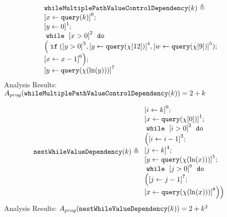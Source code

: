             \begin{example}
                \[
                    \begin{array}{l}
                    \kw{whileMultiplePathValueControlDependency}(k) \triangleq\\
                        \clabel{ \assign{x}{\query(k)}}^{0} ; \\
                        \clabel{\assign{y}{0} }^{1} ; \\
                            \ewhile ~ \clabel{x > 0}^{2} ~ \edo ~ \\
                            \Big(
                             \eif(\clabel{y > 0}^{3}, 
                             \clabel{\assign{y}{\query(\chi[12])}}^{4}, 
                             \clabel{\assign{w}{\query(\chi[9])}}^{5});                            
                             \\
                             \clabel{\assign{x}{x-1}}^{6}\Big);\\
                             \clabel{\assign{y}{\query(\chi(\ln(y)))} }^{7} 
                        \end{array}
                    \]
                    Analysis Results: $ A_{{prog}}(\mathtt{whileMultiplePathValueControlDependency}(k)) = 2 + k $
                \end{example}
                \begin{example}
                    \[
                    \kw{nestWhileValueDependency}(k) \triangleq 
                    \begin{array}{l}
                        \clabel{ \assign{i}{k} }^{0} ; \\
                        \clabel{\assign{x}{\query(\chi[0])}}^{1} ; \\
                            \ewhile ~ \clabel{i > 0}^{2} ~ \edo ~ \\
                            \Big(
                             \clabel{\assign{i}{i-1}}^{3} ;\\
                             \clabel{\assign{j}{k}}^{4} ;\\
                             \clabel{\assign{y}{\query(\chi(\ln(x)))} }^{5}  ; \\
                             \ewhile ~ \clabel{j > 0}^{6} ~ \edo ~ \\
                             \Big(
                              \clabel{\assign{j}{j-1}}^{7};\\
                              \clabel{\assign{x}{\query(\chi(\ln(x)))} }^{8}
                              \Big) \Big)
                        \end{array}
                    \]
                    Analysis Results: $ A_{{prog}}(\mathtt{nestWhileValueDependency}(k)) = 2 + k^2 $
                \end{example}

